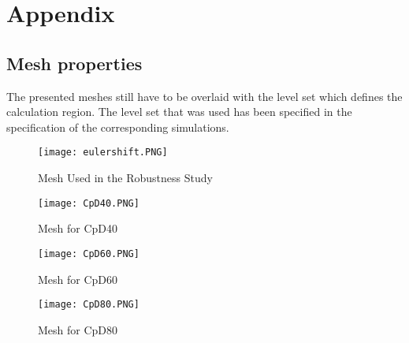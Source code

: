 \appendix
\chapter{Appendix}
\section{Mesh properties}
The presented meshes still have to be overlaid with the level set which defines the calculation region. The level set that was used has been specified in the specification of the corresponding simulations.
	\begin{figure}[htp]
		\centering
		\texttt{[image: eulershift.PNG]}
		\caption{Mesh Used in the Robustness Study}
		\label{fig:eulershift}
	\end{figure}  
	\begin{figure}[htp]
		\centering
		\texttt{[image: CpD40.PNG]}
		\caption{Mesh for CpD40}
		\label{fig:ms40}
	\end{figure}
	\begin{figure}[htp]
		\centering
		\texttt{[image: CpD60.PNG]}
		\caption{Mesh for CpD60}
		\label{fig:ms60}
	\end{figure} 
	\begin{figure}[htp]
		\centering
		\texttt{[image: CpD80.PNG]}
		\caption{Mesh for CpD80}
		\label{fig:ms80}
	\end{figure}  